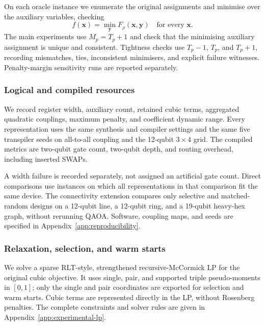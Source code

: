 \documentclass[a4paper,onecolumn,11pt,unpublished]{quantumarticle}
\theoremstyle{remark}
\begin{document}
On each oracle instance we enumerate the original assignments and minimise
over the auxiliary variables, checking
\begin{equation}
 f(\bm x)=\min_{\bm y}F_\rho(\bm x,\bm y)
 \quad\text{for every }\bm x.
 \label{eq:experimental-pointwise-check}
\end{equation}
The main experiments use $M_p=T_p+1$ and check that the minimising auxiliary
assignment is unique and consistent. Tightness checks use $T_p-1$, $T_p$,
and $T_p+1$, recording mismatches, ties, inconsistent minimisers, and explicit
failure witnesses. Penalty-margin sensitivity runs are reported separately.

\subsubsection{Logical and compiled resources}
\label{sec:resource-protocol}

We record register width, auxiliary count, retained cubic terms, aggregated
quadratic couplings, maximum penalty, and coefficient dynamic range. Every
representation uses the same synthesis and compiler settings and the same
five transpiler seeds on all-to-all coupling and the 12-qubit $3\times4$
grid. The compiled metrics are two-qubit gate count, two-qubit depth, and
routing overhead, including inserted SWAPs.

A width failure is recorded separately, not assigned an artificial gate count.
Direct comparisons use instances on which all representations in that
comparison fit the same device. The connectivity extension compares only
selective and matched-random designs on a 12-qubit line, a 12-qubit ring,
and a 19-qubit heavy-hex graph, without rerunning QAOA. Software, coupling
maps, and seeds are specified in Appendix~\ref{app:reproducibility}.

\subsubsection{Relaxation, selection, and warm starts}
\label{sec:experimental-relaxation}

We solve a sparse RLT-style, strengthened recursive-McCormick LP for the
original cubic objective. It uses single, pair, and supported triple
pseudo-moments in $[0,1]$; only the single and pair coordinates are exported
for selection and warm starts. Cubic terms are represented directly in the
LP, without Rosenberg penalties. The complete constraints and solver rules
are given in Appendix~\ref{app:experimental-lp}.
\end{document}
